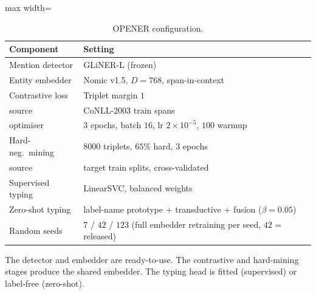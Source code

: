 \begin{table}[tp]
\centering
\caption{OPENER configuration.}
\label{tab:hyperparams}
\small
\begin{adjustbox}{max width=\textwidth}
\begin{threeparttable}
\begin{tabular}{ll}
\toprule
Component & Setting \\
\midrule
Mention detector   & GLiNER-L (frozen) \cite{zaratiana2024gliner} \\
Entity embedder    & Nomic v1.5, $D{=}768$, span-in-context \cite{nussbaum2024nomic} \\
Contrastive loss   & Triplet margin $1$ \cite{schroff2015facenet} \\
\quad source        & CoNLL-2003 train spans \cite{tjongkimsang2003conll} \\
\quad optimiser     & $3$ epochs, batch $16$, lr $2\times10^{-5}$, $100$ warmup \\
Hard-neg.\ mining  & $8000$ triplets, $65\%$ hard, $3$ epochs \\
\quad source        & target train splits, cross-validated \\
Supervised typing  & LinearSVC, balanced weights \cite{fan2008liblinear} \\
Zero-shot typing   & label-name prototype $+$ transductive $+$ fusion ($\beta{=}0.05$) \\
Random seeds       & $7$ / $42$ / $123$ (full embedder retraining per seed, $42$ = released) \\
\bottomrule
\end{tabular}
\begin{tablenotes}[flushleft]
\footnotesize
\item The detector and embedder are ready-to-use. The contrastive and hard-mining stages produce the shared embedder. The typing head is fitted (supervised) or label-free (zero-shot).
\end{tablenotes}
\end{threeparttable}
\end{adjustbox}
\end{table}

